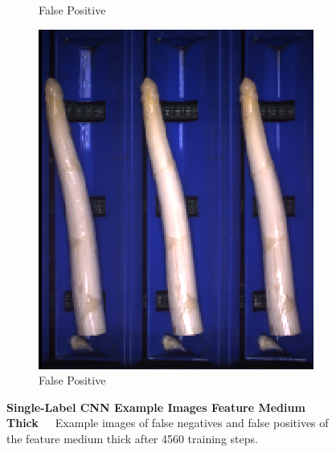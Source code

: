 \begin{figure}[h]
\begin{subfigure}{0.3\textwidth}
		\vspace{-5pt}
		\caption{False Positive}
	\end{subfigure}
	\begin{subfigure}{0.3\textwidth}
		\includegraphics[width=0.9\linewidth]{Figures/appendix/medium_falsepositive_03.png}
		\vspace{-5pt}
		\caption{False Positive}
	\end{subfigure}
	\caption[Single-Label CNN Example Images Feature Medium Thick]{\textbf{Single-Label CNN Example Images Feature Medium Thick}~~~Example images of false negatives and false positives of the feature medium thick after 4560 training steps.}
	\vspace{-20pt}
    \label{fig:ExampleImagesMediumThick}
\end{figure}


